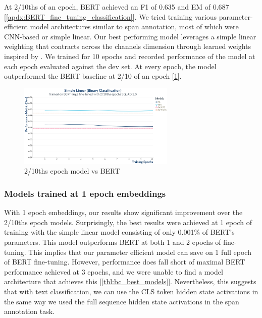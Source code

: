 At 2/10ths of an epoch, BERT achieved an F1 of 0.635 and EM of 0.687 [\ref{apdx:BERT_fine_tuning_classification}]. We tried training various parameter-efficient model architectures similar to span annotation, most of which were CNN-based or simple linear. Our best performing model leverages a simple linear weighting that contracts across the channels dimension through learned weights inspired by \cite{tenney-etal-2019-bert}. We trained for 10 epochs and recorded performance of the model at each epoch evaluated against the dev set. At every epoch, the model outperformed the BERT baseline at 2/10 of an epoch [\ref{fig:bc_2_10ths_performance}].

\begin{figure}[ht]
	\centering
	\includegraphics[width=7.5cm]{images/BinaryClassification_Tenney_Small_2_10ths_epochs_BERT_fine_tuned_Performance_plot.png}
	\caption{\label{fig:bc_2_10ths_performance}2/10ths epoch model vs BERT}
\end{figure}

\subsubsection{Models trained at 1 epoch embeddings}

With 1 epoch embeddings, our results show significant improvement over the 2/10ths epoch models. Surprisingly, the best results were achieved at 1 epoch of training with the simple linear model consisting of only 0.001\% of BERT’s parameters. This model outperforms BERT at both 1 and 2 epochs of fine-tuning. This implies that our parameter efficient model can save on 1 full epoch of BERT fine-tuning. However, performance does fall short of maximal BERT performance achieved at 3 epochs, and we were unable to find a model architecture that achieves this [\ref{tbl:bc_best_models}]. Nevertheless, this suggests that with text classification, we can use the CLS token hidden state activations in the same way we used the full sequence hidden state activations in the span annotation task. 

